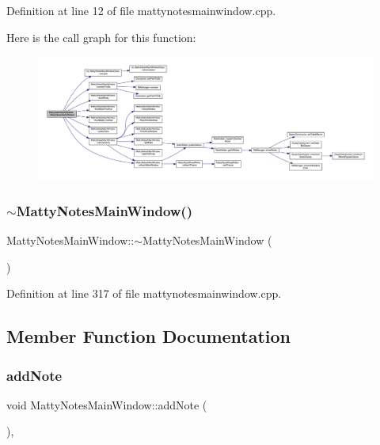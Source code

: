 Definition at line 12 of file mattynotesmainwindow.\+cpp.

Here is the call graph for this function\+:
\nopagebreak
\begin{figure}[H]
\begin{center}
\leavevmode
\includegraphics[width=350pt]{classMattyNotesMainWindow_aa788ae37a712be6e1ea281c349342908_cgraph}
\end{center}
\end{figure}
\hypertarget{classMattyNotesMainWindow_a691c1dfd2497d55387fe8ee6177c92d7}{}\label{classMattyNotesMainWindow_a691c1dfd2497d55387fe8ee6177c92d7} 
\subsubsection{\texorpdfstring{$\sim$\+Matty\+Notes\+Main\+Window()}{~MattyNotesMainWindow()}}
{\footnotesize\ttfamily Matty\+Notes\+Main\+Window\+::$\sim$\+Matty\+Notes\+Main\+Window (\begin{DoxyParamCaption}{ }\end{DoxyParamCaption})}



Definition at line 317 of file mattynotesmainwindow.\+cpp.



\subsection{Member Function Documentation}
\hypertarget{classMattyNotesMainWindow_af77c5a79f0a941dbb980776df6a8b1eb}{}\label{classMattyNotesMainWindow_af77c5a79f0a941dbb980776df6a8b1eb} 
\subsubsection{\texorpdfstring{add\+Note}{addNote}}
{\footnotesize\ttfamily void Matty\+Notes\+Main\+Window\+::add\+Note (\begin{DoxyParamCaption}{ }\end{DoxyParamCaption})\hspace{0.3cm}{\ttfamily [private]}, {\ttfamily [slot]}}



